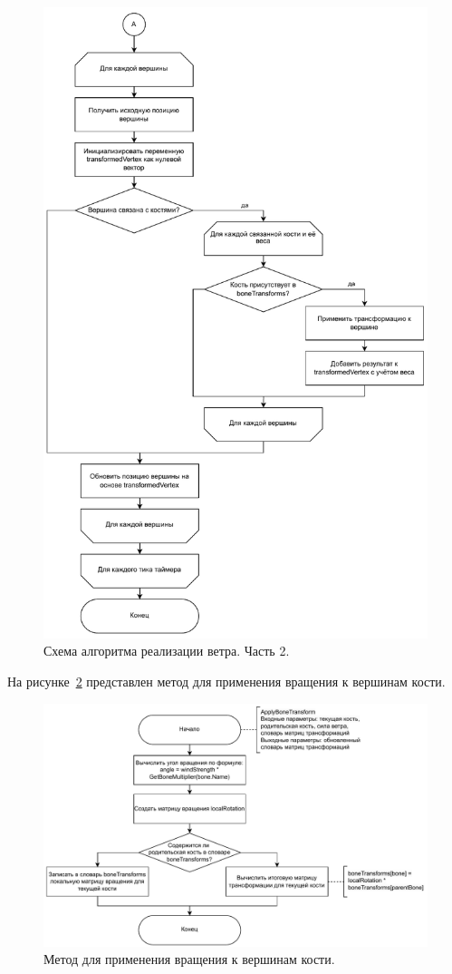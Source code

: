 \begin{figure}[H]
    \centering
    \includegraphics[width=115mm]{images/Wind_2}
    \caption{Схема алгоритма реализации ветра. Часть 2.}
    \label{images:Wind_2}
\end{figure}


На рисунке~\ref{images:ApplyBoneTransform} представлен метод для применения вращения к вершинам кости.
\begin{figure}[H]
    \centering
    \includegraphics[width=135mm]{images/ApplyBoneTransform}
    \caption{Метод для применения вращения к вершинам кости.}
    \label{images:ApplyBoneTransform}
\end{figure}



